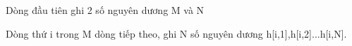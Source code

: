 Dòng đầu tiên ghi 2 số nguyên dương M và N  

   Dòng thứ i trong M dòng tiếp theo, ghi N số nguyên dương h[i,1],h[i,2]...h[i,N].  

\